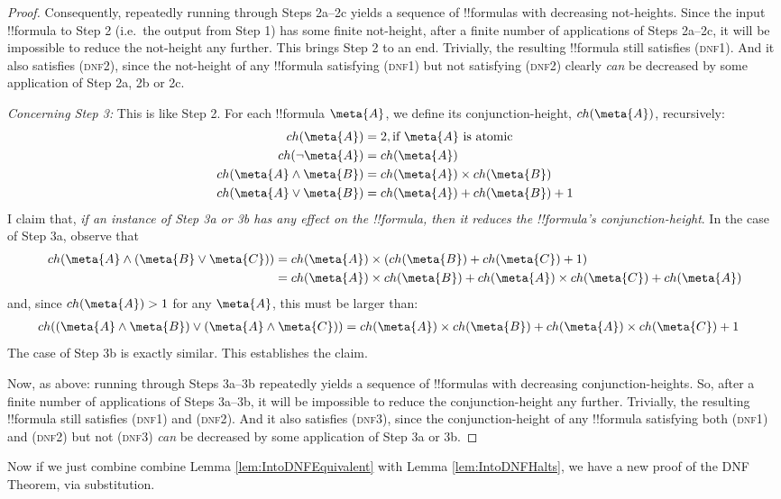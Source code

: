\documentclass[../../../include/open-logic-section]{subfiles}
\begin{document}
\begin{lem}
\begin{proof}
		Consequently, repeatedly running through Steps 2a--2c yields a sequence of !!{formula}s with decreasing not-heights. Since the input !!{formula} to Step 2 (i.e.\ the output from Step 1) has some finite not-height, after a finite number of applications of Steps 2a--2c, it will be impossible to reduce the not-height any further. This brings Step 2 to an end. Trivially, the resulting !!{formula} still satisfies (\textsc{dnf1}). And it also satisfies (\textsc{dnf2}), since the not-height of any !!{formula} satisfying (\textsc{dnf1}) but not satisfying (\textsc{dnf2}) clearly \emph{can} be decreased by some application of Step 2a, 2b or 2c.
		
		\emph{Concerning Step 3:} This is like Step 2. For each !!{formula} $\meta{A}$, we define its conjunction-height, $ch(\meta{A})$, recursively:
			\begin{align*}
				ch(\meta{A}) &= 2, \text{if }\meta{A}\text{ is atomic}\\
				ch(\lnot \meta{A}) &= ch(\meta{A})\\
				ch(\meta{A} \land \meta{B}) &= ch(\meta{A}) \times ch(\meta{B})\\
				ch(\meta{A} \lor \meta{B}) &=  ch(\meta{A}) + ch(\meta{B}) + 1
			\end{align*}
		I claim that, \emph{if an instance of Step 3a or 3b has any effect on the !!{formula}, then it reduces the !!{formula}'s conjunction-height}. In the case of Step 3a, observe that 
			\begin{align*}
				ch(\meta{A} \land (\meta{B} \lor \meta{C})) &= ch(\meta{A}) \times  (ch(\meta{B}) + ch(\meta{C}) + 1)\\
					&= ch(\meta{A})\times ch(\meta{B}) + ch(\meta{A}) \times ch(\meta{C}) + ch(\meta{A})
			\end{align*}
		and, since $ch(\meta{A}) > 1$ for any $\meta{A}$, this must be larger than:
			\begin{align*}
				ch((\meta{A} \land \meta{B}) \lor (\meta{A} \land \meta{C})) &= ch(\meta{A}) \times ch(\meta{B}) + ch(\meta{A}) \times ch(\meta{C}) + 1 
			\end{align*}
		The case of Step 3b is exactly similar. This establishes the claim. 
		
		Now, as above: running through Steps 3a--3b repeatedly yields a sequence of !!{formula}s with decreasing conjunction-heights. So, after a finite number of applications of Steps 3a--3b, it will be impossible to reduce the conjunction-height any further. Trivially, the resulting !!{formula} still satisfies (\textsc{dnf1}) and (\textsc{dnf2}). And it also satisfies (\textsc{dnf3}), since the conjunction-height of any !!{formula} satisfying both (\textsc{dnf1}) and (\textsc{dnf2}) but not (\textsc{dnf3}) \emph{can} be decreased by some application of Step 3a or 3b.
	\end{proof}
\end{lem}\noindent
Now if we just combine combine Lemma \ref{lem:IntoDNFEquivalent} with Lemma \ref{lem:IntoDNFHalts}, we have a new proof of the DNF Theorem, via substitution.
\end{document}
